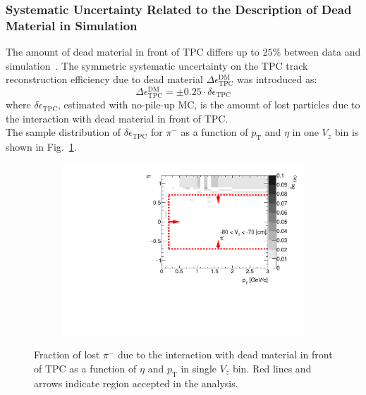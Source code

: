 
\subsubsection{Systematic Uncertainty Related to the Description of  Dead Material in Simulation}

The amount of dead material in front of TPC differs up to $25\%$ between data and simulation~\cite{RafalThesis}. The symmetric systematic uncertainty on the TPC track reconstruction efficiency due to dead material $\Delta\epsilon_\textrm{TPC}^\textrm{DM}$ was introduced as:
\begin{equation}
\Delta\epsilon_\textrm{TPC}^\textrm{DM} = \pm0.25\cdot\delta\epsilon_\textrm{TPC}
\end{equation}
 where $\delta\epsilon_\textrm{TPC}$, estimated with no-pile-up MC, is the amount of lost particles due to the interaction with dead material in front of TPC. 
 \\The sample distribution of $\delta\epsilon_\textrm{TPC}$ for $\pi^-$ as a function of $p_\textrm{T}$ and $\eta$ in one $V_z$ bin is shown in Fig.~\ref{fig:deadMaterialSyst}.
\begin{figure}[h!]
	\vspace{-0.3cm}
	\centering
	\begin{subfigure}{.55\textwidth}
		\includegraphics[width=\textwidth,page=9]{chapters/chrgSTAR/img/tpcEffi/secondaries_Unbinned_SDCD_.pdf}
	\end{subfigure}
	\begin{minipage}{.44\textwidth}
		\caption{Fraction of lost $\pi^-$ due to the interaction with dead material in front of TPC as a function of  $\eta$ and $p_\textrm{T}$ in single $V_z$ bin. Red lines and arrows indicate region accepted in the analysis.}
		\label{fig:deadMaterialSyst}
	\end{minipage}
	\vspace{-0.2cm}
\end{figure}
\FloatBarrier